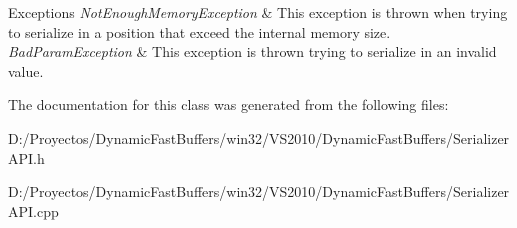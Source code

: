 \begin{DoxyExceptions}{Exceptions}
{\em Not\-Enough\-Memory\-Exception} & This exception is thrown when trying to serialize in a position that exceed the internal memory size. \\
\hline
{\em Bad\-Param\-Exception} & This exception is thrown trying to serialize in an invalid value. \\
\hline
\end{DoxyExceptions}


The documentation for this class was generated from the following files\-:\begin{DoxyCompactItemize}
\item 
D\-:/\-Proyectos/\-Dynamic\-Fast\-Buffers/win32/\-V\-S2010/\-Dynamic\-Fast\-Buffers/Serializer\-A\-P\-I.\-h\item 
D\-:/\-Proyectos/\-Dynamic\-Fast\-Buffers/win32/\-V\-S2010/\-Dynamic\-Fast\-Buffers/Serializer\-A\-P\-I.\-cpp\end{DoxyCompactItemize}
